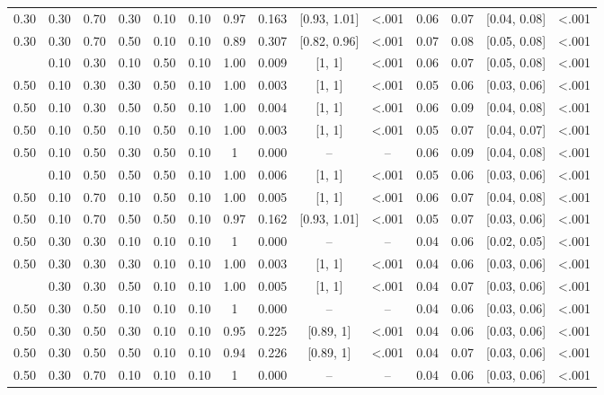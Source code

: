 \documentclass[
  11pt,
]{article}
\begin{document}
\begin{landscape}
\begin{ThreePartTable}
\begin{longtable}[t]{cccccccccccccc}
0.30 & 0.30 & 0.70 & 0.30 & 0.10 & 0.10 & 0.97 & 0.163 & {}[0.93, 1.01] & <.001 & 0.06 & 0.07 & {}[0.04, 0.08] & <.001\\
0.30 & 0.30 & 0.70 & 0.50 & 0.10 & 0.10 & 0.89 & 0.307 & {}[0.82, 0.96] & <.001 & 0.07 & 0.08 & {}[0.05, 0.08] & <.001\\
\addlinespace
0.50 & 0.10 & 0.30 & 0.10 & 0.50 & 0.10 & 1.00 & 0.009 & {}[1, 1] & <.001 & 0.06 & 0.07 & {}[0.05, 0.08] & <.001\\
0.50 & 0.10 & 0.30 & 0.30 & 0.50 & 0.10 & 1.00 & 0.003 & {}[1, 1] & <.001 & 0.05 & 0.06 & {}[0.03, 0.06] & <.001\\
0.50 & 0.10 & 0.30 & 0.50 & 0.50 & 0.10 & 1.00 & 0.004 & {}[1, 1] & <.001 & 0.06 & 0.09 & {}[0.04, 0.08] & <.001\\
0.50 & 0.10 & 0.50 & 0.10 & 0.50 & 0.10 & 1.00 & 0.003 & {}[1, 1] & <.001 & 0.05 & 0.07 & {}[0.04, 0.07] & <.001\\
0.50 & 0.10 & 0.50 & 0.30 & 0.50 & 0.10 & 1 & 0.000 & {} – & – & 0.06 & 0.09 & {}[0.04, 0.08] & <.001\\
\addlinespace
0.50 & 0.10 & 0.50 & 0.50 & 0.50 & 0.10 & 1.00 & 0.006 & {}[1, 1] & <.001 & 0.05 & 0.06 & {}[0.03, 0.06] & <.001\\
0.50 & 0.10 & 0.70 & 0.10 & 0.50 & 0.10 & 1.00 & 0.005 & {}[1, 1] & <.001 & 0.06 & 0.07 & {}[0.04, 0.08] & <.001\\
0.50 & 0.10 & 0.70 & 0.50 & 0.50 & 0.10 & 0.97 & 0.162 & {}[0.93, 1.01] & <.001 & 0.05 & 0.07 & {}[0.03, 0.06] & <.001\\
0.50 & 0.30 & 0.30 & 0.10 & 0.10 & 0.10 & 1 & 0.000 & {} – & – & 0.04 & 0.06 & {}[0.02, 0.05] & <.001\\
0.50 & 0.30 & 0.30 & 0.30 & 0.10 & 0.10 & 1.00 & 0.003 & {}[1, 1] & <.001 & 0.04 & 0.06 & {}[0.03, 0.06] & <.001\\
\addlinespace
0.50 & 0.30 & 0.30 & 0.50 & 0.10 & 0.10 & 1.00 & 0.005 & {}[1, 1] & <.001 & 0.04 & 0.07 & {}[0.03, 0.06] & <.001\\
0.50 & 0.30 & 0.50 & 0.10 & 0.10 & 0.10 & 1 & 0.000 & {} – & – & 0.04 & 0.06 & {}[0.03, 0.06] & <.001\\
0.50 & 0.30 & 0.50 & 0.30 & 0.10 & 0.10 & 0.95 & 0.225 & {}[0.89, 1] & <.001 & 0.04 & 0.06 & {}[0.03, 0.06] & <.001\\
0.50 & 0.30 & 0.50 & 0.50 & 0.10 & 0.10 & 0.94 & 0.226 & {}[0.89, 1] & <.001 & 0.04 & 0.07 & {}[0.03, 0.06] & <.001\\
0.50 & 0.30 & 0.70 & 0.10 & 0.10 & 0.10 & 1 & 0.000 & {} – & – & 0.04 & 0.06 & {}[0.03, 0.06] & <.001\\

\end{longtable}
\end{ThreePartTable}
\end{landscape}
\end{document}
